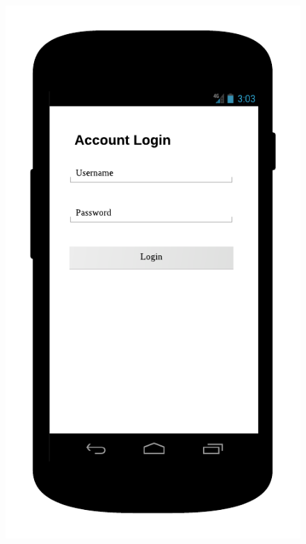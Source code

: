 \begin{figure}
\centering
\begin{minipage}{.5\textwidth}
  \centering
  \includegraphics[width=.7\linewidth]{Images/mockups/login.png}
\end{minipage}%
\begin{minipage}{.5\textwidth}
  \centering

\end{minipage}
\end{figure}
